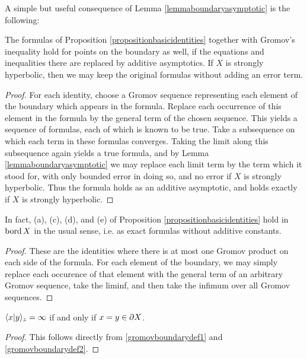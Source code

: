 A simple but useful consequence of Lemma \ref{lemmaboundaryasymptotic} is the following:

\begin{corollary}
\label{corollaryboundaryasymptotic}
The formulas of Proposition \ref{propositionbasicidentities} together with Gromov's inequality hold for points on the boundary as well, if the equations and inequalities there are replaced by additive asymptotics.
 If $X$ is strongly hyperbolic, then we may keep the original formulas without adding an error term.
\end{corollary}
\begin{proof}
For each identity, choose a Gromov sequence representing each element of the boundary which appears in the formula. Replace each occurrence of this element in the formula by the general term of the chosen sequence. This yields a sequence of formulas, each of which is known to be true. Take a subsequence on which each term in these formulas converges. Taking the limit along this subsequence again yields a true formula, and by Lemma \ref{lemmaboundaryasymptotic} we may replace each limit term by the term which it stood for, with only bounded error in doing so, and no error if $X$ is strongly hyperbolic. Thus the formula holds as an additive asymptotic, and holds exactly if $X$ is strongly hyperbolic.
\end{proof}

\begin{remark}
\label{remarkacde}
In fact, (a), (c), (d), and (e) of Proposition \ref{propositionbasicidentities} hold in $\operatorname{bord} X$ in the usual sense, i.e. as exact formulas without additive constants. 
\end{remark}
\begin{proof}
These are the identities where there is at most one Gromov product on each side of the formula. For each element of the boundary, we may simply replace each occurence of that element with the general term of an arbitrary Gromov sequence, take the liminf, and then take the infimum over all Gromov sequences.
\end{proof}

\begin{observation}
\label{observationyzinfinity}
$\langle x|y\rangle_z = \infty$ if and only if $x = y\in\partial X$.
\end{observation}
\begin{proof}
This follows directly from \eqref{gromovboundarydef1} and \eqref{gromovboundarydef2}.
\end{proof}

